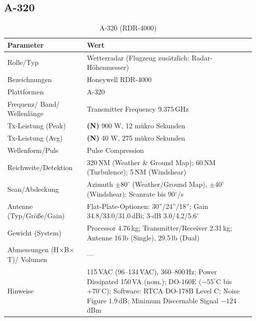 \subsection{A-320 \parencite{Honeywell_RDR4000_Specs}}
\begin{table}[h]
\centering
\renewcommand{\arraystretch}{1.15}
\begin{tabular}{p{3.9cm} p{10.7cm}}
\hline
\textbf{Parameter} & \textbf{Wert} \\
\hline
Rolle/Typ & Wetterradar (Flugzeug zusätzlich: Radar-Höhenmesser) \\
Bezeichnungen & Honeywell RDR-4000 \\
Plattformen & A-320 \\
Frequenz/ Band/ Wellenlänge & Transmitter Frequency 9.375\,GHz \\
Tx-Leistung (Peak) & \textbf{(N)} 900 W, 12 mükro Sekunden \\
Tx-Leistung (Avg) & \textbf{(N)} 40 W, 275 mükro Sekunden \\
Wellenform/Puls & Pulse Compression \\
Reichweite/Detektion & 320\,NM (Weather \& Ground Map); 60\,NM (Turbulence); 5\,NM (Windshear) \\
Scan/Abdeckung & Azimuth \(\pm 80^\circ\) (Weather/Ground Map), \(\pm 40^\circ\) (Windshear); Scanrate bis 90\(^\circ\)/s \\
Antenne (Typ/Größe/Gain) & Flat-Plate-Optionen: 30''/24''/18''; Gain 34.8/33.0/31.0\,dBi; 3-dB 3.0/4.2/5.6\(^\circ\) \\
Gewicht (System) & Processor 4.76\,kg; Transmitter/Receiver 2.31\,kg; Antenne 16\,lb (Single), 29.5\,lb (Dual) \\
Abmessungen (H\(\times\)B\(\times\)T)/ Volumen & --- \\
Hinweise & 115\,VAC (96--134\,VAC), 360--800\,Hz; Power Dissipated 150\,VA (nom.); DO-160E (\(-55^\circ\)C bis \(+70^\circ\)C); Software: RTCA DO-178B Level C; Noise Figure 1.9\,dB; Minimum Discernable Signal \(-124\)\,dBm \\
\hline
\end{tabular}
\caption{A-320 (RDR-4000)}
\end{table}

